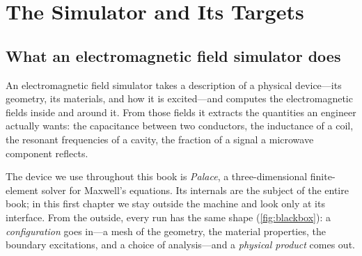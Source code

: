 \chapter{The Simulator and Its Targets}
\label{ch:targets}


\section{What an electromagnetic field simulator does}

An electromagnetic field simulator takes a description of a physical
device---its geometry, its materials, and how it is excited---and computes the
electromagnetic fields inside and around it. From those fields it extracts the
quantities an engineer actually wants: the capacitance between two conductors,
the inductance of a coil, the resonant frequencies of a cavity, the fraction of
a signal a microwave component reflects.

The device we use throughout this book is \emph{Palace}, a three-dimensional
finite-element solver for Maxwell's equations. Its internals are the subject of
the entire book; in this first chapter we stay outside the machine and look only
at its interface. From the outside, every run has the same shape
(\cref{fig:blackbox}): a \emph{configuration} goes in---a mesh of the geometry,
the material properties, the boundary excitations, and a choice of analysis---and
a \emph{physical product} comes out.

